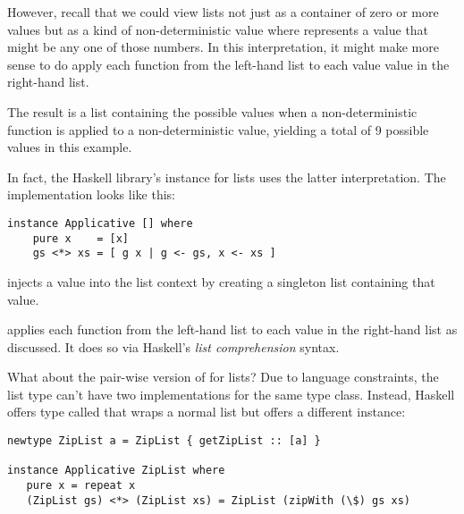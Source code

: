 However, recall that we could view lists not just as a container of zero or more values but as a kind of non-deterministic value
where \code{[4, 5, 6]} represents a value that might be any one of those numbers. In this interpretation, it might make more
sense to do apply each function from the left-hand list to each value value in the right-hand list.

The result is a list containing the possible values when a non-deterministic function is applied to a non-deterministic
value, yielding a total of 9 possible values in this example.

In fact, the Haskell library's  instance for lists uses the latter interpretation. The implementation looks like this:

\begin{lstlisting}
instance Applicative [] where
    pure x    = [x]
    gs <*> xs = [ g x | g <- gs, x <- xs ]
\end{lstlisting}

\begin{notelist}
    \item {} injects a value into the list context by creating a singleton list containing that value.
    \item \code{(<*>)} applies each function from the left-hand list to each value in the right-hand list as discussed. It does
          so via Haskell's \textit{list comprehension} syntax.
\end{notelist}

What about the pair-wise version of  for lists? Due to language constraints, the list type can't have
two implementations for the same type class. Instead, Haskell offers type called  that wraps a normal
list but offers a different  instance:

\begin{lstlisting}
newtype ZipList a = ZipList { getZipList :: [a] }
 
instance Applicative ZipList where
   pure x = repeat x
   (ZipList gs) <*> (ZipList xs) = ZipList (zipWith (\$) gs xs)
\end{lstlisting}

